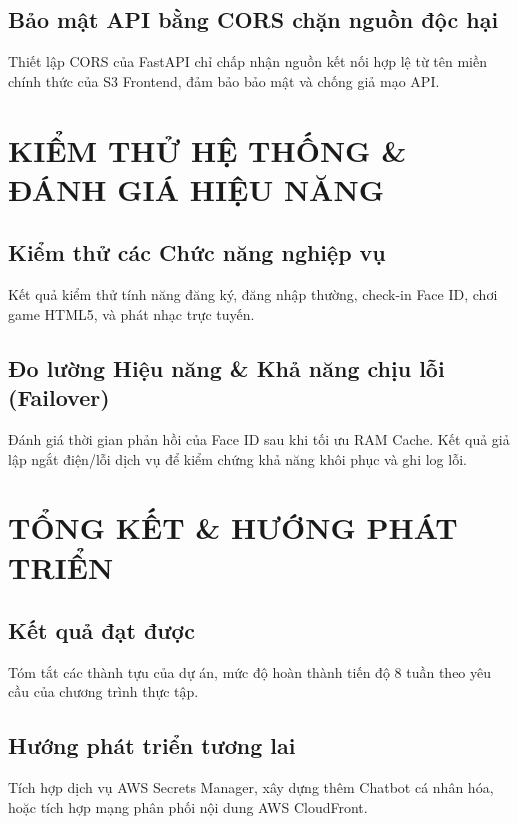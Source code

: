 \documentclass[12pt,a4paper]{report}
\begin{document}
\section{Bảo mật API bằng CORS chặn nguồn độc hại}
Thiết lập CORS của FastAPI chỉ chấp nhận nguồn kết nối hợp lệ từ tên miền chính thức của S3 Frontend, đảm bảo bảo mật và chống giả mạo API.

\chapter{KIỂM THỬ HỆ THỐNG \& ĐÁNH GIÁ HIỆU NĂNG}
\section{Kiểm thử các Chức năng nghiệp vụ}
Kết quả kiểm thử tính năng đăng ký, đăng nhập thường, check-in Face ID, chơi game HTML5, và phát nhạc trực tuyến.

\section{Đo lường Hiệu năng & Khả năng chịu lỗi (Failover)}
Đánh giá thời gian phản hồi của Face ID sau khi tối ưu RAM Cache. Kết quả giả lập ngắt điện/lỗi dịch vụ để kiểm chứng khả năng khôi phục và ghi log lỗi.

\chapter{TỔNG KẾT \& HƯỚNG PHÁT TRIỂN}
\section{Kết quả đạt được}
Tóm tắt các thành tựu của dự án, mức độ hoàn thành tiến độ 8 tuần theo yêu cầu của chương trình thực tập.

\section{Hướng phát triển tương lai}
Tích hợp dịch vụ AWS Secrets Manager, xây dựng thêm Chatbot cá nhân hóa, hoặc tích hợp mạng phân phối nội dung AWS CloudFront.
\end{document}
